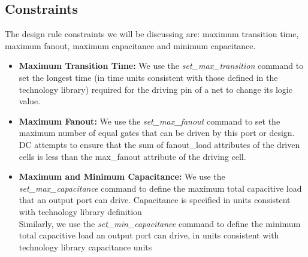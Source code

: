\documentclass[../main.tex]{subfiles}
\begin{document}
    \subsection{Constraints}
The design rule constraints we will be discussing are: maximum transition time, maximum fanout, maximum capacitance and minimum capacitance. 
\begin{itemize}
\item \textbf{Maximum Transition Time:} We use the \textit{set\_max\_transition} command to set the longest time (in time units consistent with those defined in the technology library) required for the driving pin of a net to change its logic value.
\item \textbf{Maximum Fanout:} We use the \textit{set\_max\_fanout} command to set the maximum number of equal gates that can be driven by this port or design. DC attempts to ensure that the sum of fanout\_load attributes of the driven cells is less than the max\_fanout attribute of the driving cell.
\item \textbf{Maximum and Minimum Capacitance:} We use the \textit{set\_max\_capacitance} command to define the maximum total capacitive load that an output port can drive. Capacitance is specified in units consistent with technology library definition
\\Similarly, we use the\textit{ set\_min\_capacitance} command to define the minimum total capacitive load an output port can drive, in units consistent with technology library capacitance units
\end{itemize}
\end{document}
